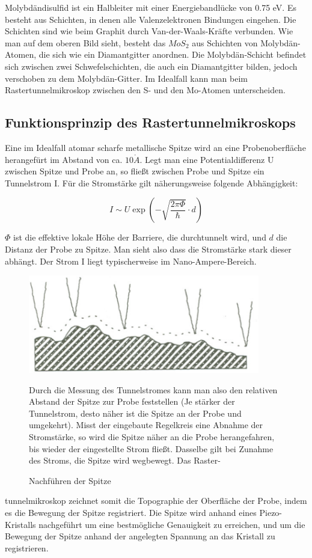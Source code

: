 Molybdändisulfid ist ein Halbleiter mit einer Energiebandlücke von 0.75 eV. Es besteht aus Schichten, in denen alle Valenzelektronen Bindungen eingehen. Die Schichten sind wie beim Graphit durch Van-der-Waals-Kräfte verbunden. Wie man auf dem oberen Bild sieht, besteht das $MoS_2$ aus Schichten von Molybdän-Atomen, die sich wie ein Diamantgitter anordnen. Die Molybdän-Schicht befindet sich zwischen zwei Schwefelschichten, die auch ein Diamantgitter bilden, jedoch verschoben zu dem Molybdän-Gitter. Im Idealfall kann man beim Rastertunnelmikroskop zwischen den S- und den Mo-Atomen unterscheiden.

\subsection{Funktionsprinzip des Rastertunnelmikroskops}

Eine im Idealfall atomar scharfe metallische Spitze wird an eine Probenoberfläche herangefürt im Abstand von ca. $10 \mathring A$. Legt man eine Potentialdifferenz U zwischen Spitze und Probe an, so fließt zwischen Probe und Spitze ein Tunnelstrom I. Für die Stromstärke gilt näherungsweise folgende Abhängigkeit:

$$ I \sim U\exp\left(-\sqrt{\frac{2\pi\Phi}{\hbar}}\cdot d\right) $$

$\Phi$ ist die effektive lokale Höhe der Barriere, die durchtunnelt wird, und $d$ die Distanz der Probe zu Spitze. Man sieht also dass die Stromstärke stark dieser abhängt. Der Strom I liegt typischerweise im Nano-Ampere-Bereich.

\begin{figure}[H]
\begin{minipage}{0.5\textwidth}
	\includegraphics[width=0.9\textwidth]{Bilder/CCM.png}
	\centering \caption{Nachführen der Spitze}
\end{minipage}
\begin{minipage}{0.5\textwidth}
Durch die Messung des Tunnelstromes kann man also den relativen Abstand der Spitze zur Probe feststellen (Je stärker der Tunnelstrom, desto näher ist die Spitze an der Probe und umgekehrt). Misst  der eingebaute Regelkreis eine Abnahme der Stromstärke, so wird die Spitze näher an die Probe herangefahren, bis wieder der eingestel\-lte Strom fließt. Dasselbe gilt bei Zunahme des Stroms, die Spitze wird wegbewegt. Das Raster-
\end{minipage}
\end{figure}
tunnelmikroskop zeichnet somit die Topographie der Oberfläche der Probe, indem es die Bewegung der Spitze registriert. Die Spitze wird anhand eines Piezo-Kristalls nachgeführt um eine bestmögliche Genauigkeit zu erreichen, und um die Bewegung der Spitze anhand der angelegten Spannung an das Kristall zu registrieren.

